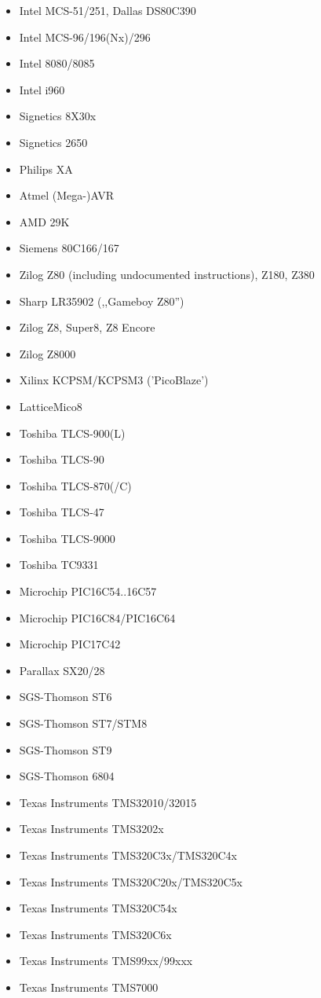 \documentclass[12pt,twoside]{report}
\begin{document}
\begin{itemize}
{      variants}
\item{Intel MCS-51/251, Dallas DS80C390}
\item{Intel MCS-96/196(Nx)/296}
\item{Intel 8080/8085}
\item{Intel i960}
\item{Signetics 8X30x}
\item{Signetics 2650}
\item{Philips XA}
\item{Atmel (Mega-)AVR}
\item{AMD 29K}
\item{Siemens 80C166/167}
\item{Zilog Z80 (including undocumented instructions), Z180, Z380}
\item{Sharp LR35902 (,,Gameboy Z80'')}
\item{Zilog Z8, Super8, Z8 Encore}
\item{Zilog Z8000}
\item{Xilinx KCPSM/KCPSM3 ('PicoBlaze')}
\item{LatticeMico8}
\item{Toshiba TLCS-900(L)}
\item{Toshiba TLCS-90}
\item{Toshiba TLCS-870(/C)}
\item{Toshiba TLCS-47}
\item{Toshiba TLCS-9000}
\item{Toshiba TC9331}
\item{Microchip PIC16C54..16C57}
\item{Microchip PIC16C84/PIC16C64}
\item{Microchip PIC17C42}
\item{Parallax SX20/28}
\item{SGS-Thomson ST6}
\item{SGS-Thomson ST7/STM8}
\item{SGS-Thomson ST9}
\item{SGS-Thomson 6804}
\item{Texas Instruments TMS32010/32015}
\item{Texas Instruments TMS3202x}
\item{Texas Instruments TMS320C3x/TMS320C4x}
\item{Texas Instruments TMS320C20x/TMS320C5x}
\item{Texas Instruments TMS320C54x}
\item{Texas Instruments TMS320C6x}
\item{Texas Instruments TMS99xx/99xxx}
\item{Texas Instruments TMS7000}

\end{itemize}
\end{document}
